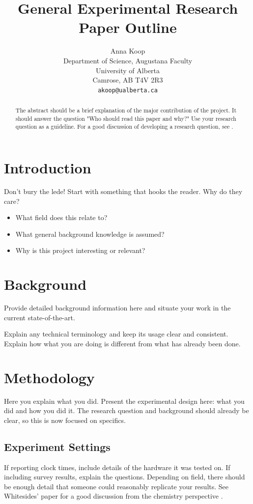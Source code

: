 \documentclass{article} %
\title{General Experimental Research Paper Outline}
\author{
Anna Koop\\
Department of Science, Augustana Faculty\\
University of Alberta\\
Camrose, AB T4V 2R3 \\
\texttt{akoop@ualberta.ca}
}
\begin{document}
\maketitle

\begin{abstract}
The abstract should be a brief explanation of the major contribution of the project. It should answer the question "Who should read this paper and why?" Use your research question as a guideline. For a good discussion of developing a research question, see \cite{Wright1999}.
\end{abstract}

\section{Introduction}
\label{sec:intro}
Don't bury the lede! Start with something that hooks the reader. Why do they care?

\begin{itemize}
\item What field does this relate to?
\item What general background knowledge is assumed?
\item Why is this project interesting or relevant?
\end{itemize}

\section{Background}
\label{sec:background}
Provide detailed background information here and situate your work in the current state-of-the-art.

Explain any technical terminology and keep its usage clear and consistent.
Explain how what you are doing is different from what has already been done.

\section{Methodology}
\label{sec:methods}
Here you explain what you did. Present the experimental design here: what you did and how you did it. The research question and background should already be clear, so this is now focused on specifics.

\subsection{Experiment Settings}
\label{sec:exp}
If reporting clock times, include details of the hardware it was tested on. If including survey results, explain the questions. Depending on field, there should be enough detail that someone could reasonably replicate your results. See Whitesides' paper for a good discussion from the chemistry perspective \cite{Whitesides2004}.
\end{document}
